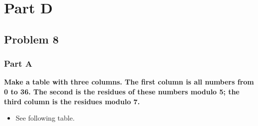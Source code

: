 \documentclass[11pt]{article}
\begin{document}
\section*{Part D}

\subsection*{Problem 8}

\subsubsection*{Part A} 

\textbf{Make a table with three columns. The first column is all numbers
from 0 to 36. The second is the residues of these numbers modulo 5;
the third column is the residues modulo 7.}

  \begin{itemize}
  
  \item See following table.
  
  \end{itemize}
\end{document}

